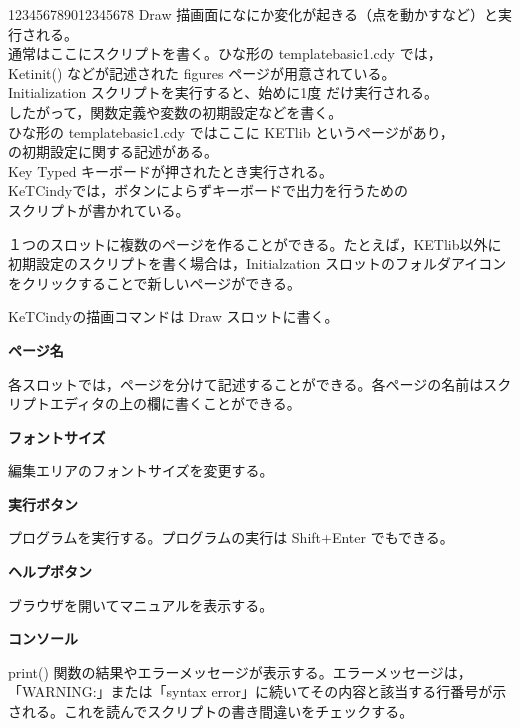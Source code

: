 \documentclass[papersize,a4paper,12pt,uplatex]{jsarticle}
\begin{document}
\begin{tabbing}
123456789012345678\=\kill
Draw \>描画面になにか変化が起きる（点を動かすなど）と実行される。\\
 \>通常はここにスクリプトを書く。ひな形の templatebasic1.cdy では，\\
 \>Ketinit() などが記述された figures ページが用意されている。\\
Initialization \>スクリプトを実行すると、始めに1度 だけ実行される。\\
 \>したがって，関数定義や変数の初期設定などを書く。\\
 \>ひな形の templatebasic1.cdy ではここに KETlib というページがあり，\\
 \>\ketcindy の初期設定に関する記述がある。\\
Key Typed   \>キーボードが押されたとき実行される。\\
   \> KeTCindyでは，ボタンによらずキーボードで出力を行うための\\
   \>スクリプトが書かれている。
\end{tabbing}

１つのスロットに複数のページを作ることができる。たとえば，KETlib以外に初期設定のスクリプトを書く場合は，Initialzation スロットのフォルダアイコンをクリックすることで新しいページができる。

KeTCindyの描画コマンドは Draw スロットに書く。

\vspace{\baselineskip}\noindent
{\bf  ページ名}

各スロットでは，ページを分けて記述することができる。各ページの名前はスクリプトエディタの上の欄に書くことができる。

\noindent
{\bf  フォントサイズ}

編集エリアのフォントサイズを変更する。

\noindent
{\bf  実行ボタン}

プログラムを実行する。プログラムの実行は Shift+Enter でもできる。

\noindent
{\bf  ヘルプボタン}

ブラウザを開いてマニュアルを表示する。

\noindent
{\bf  コンソール}

print() 関数の結果やエラーメッセージが表示する。エラーメッセージは，「WARNING:」または「syntax error」に続いてその内容と該当する行番号が示される。これを読んでスクリプトの書き間違いをチェックする。
\end{document}
